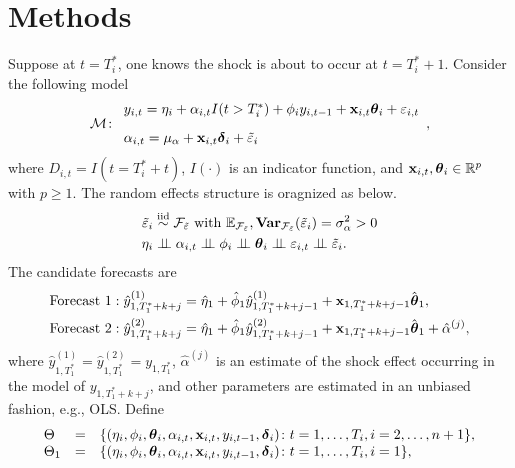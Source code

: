 \documentclass[12pt]{article}
\begin{document}
\section{Methods}

Suppose at $t=T_i^*$, one knows the shock is about to occur at $t=T_i^*+1$. Consider the following model
\begin{align*}
  \mathcal{M} \colon 
  \begin{array}{l}
    y_{i,t} = \eta_i +  \alpha_{i,t}I(t > T_i^*)+ \phi_i y_{i,t-1} + \mathbf{x}_{i,t}\boldsymbol{\theta}_i + \varepsilon_{i,t}\\[.3cm]
    \alpha_{i,t} = \mu_{\alpha} + \mathbf{x}_{i, t}\boldsymbol{\delta}_i + \tilde{\varepsilon}_i
  \end{array},
\end{align*}
where $D_{i,t}= I(t= T_i^* +t)$, $I(\cdot)$ is an indicator function, and $\mathbf{x}_{i,t}, \boldsymbol{\theta}_{i}\in \mathbb{R}^p$ with $p\geq 1$. The random effects structure is oragnized as below.
\begin{align*}
  \tilde{\varepsilon}_i &\simiid \mc{F}_{\tilde{\varepsilon}} \text{ with } \E_{\mc{F}_{\tilde{\varepsilon}}}, \Var_{\mc{F}_{\tilde{\varepsilon}}}(\tilde{\varepsilon}_i)= \sigma^2_{\alpha}  >0 \\
  \eta_i & \indep \alpha_{i,t} \indep \phi_i \indep \boldsymbol{\theta}_i \indep \varepsilon_{i,t} \indep \tilde{\varepsilon}_i.
\end{align*}
The candidate forecasts are
\begin{align*}
  &\text{Forecast 1}: \hat{y}_{1,T_1^*+k + j}^{(1)} = \hat\eta_1 
    + \hat\phi_1 \hat{y}^{(1)}_{1,T_1^*+k+j-1} + \mathbf{x}_{1,T_1^*+k+j-1} \hat{\boldsymbol{\theta}}_1
    , \\
  &\text{Forecast 2}: \hat{y}_{1,T_1^*+k+j}^{(2)} = \hat\eta_1 
    + \hat\phi_1 \hat{y}^{(2)}_{1,T_1^*+k+j-1} + \mathbf{x}_{1,T_1^*+k+j-1} \hat{\boldsymbol{\theta}}_1
    + \hat{\alpha}^{(j)},
\end{align*}
where $\hat{y}_{1, T_1^*}^{(1)}=\hat{y}_{1, T_1^*}^{(2)}=y_{1,T_1^*}$, $\hat{\alpha}^{(j)}$ is an estimate of the shock effect occurring in the model of $y_{1,T_1^*+k+j}$, and other parameters are estimated in an unbiased fashion, e.g., OLS. Define
\begin{align}
  \begin{array}{lll}
     \Theta &= &\{(\eta_i, \phi_i, \boldsymbol{\theta}_i, \alpha_{i,t}, \mathbf{x}_{i,t}, y_{i,t-1}, \boldsymbol{\delta}_i)\colon t= 1, \ldots, T_i, i = 2, \ldots, n +1\},\\
    \Theta_1 &= &\{(\eta_i, \phi_i, \boldsymbol{\theta}_i, \alpha_{i,t}, \mathbf{x}_{i,t}, y_{i,t-1}, \boldsymbol{\delta}_i)\colon t= 1, \ldots, T_i, i = 1\},\label{parameter}
  \end{array}
\end{align}
\end{document}
